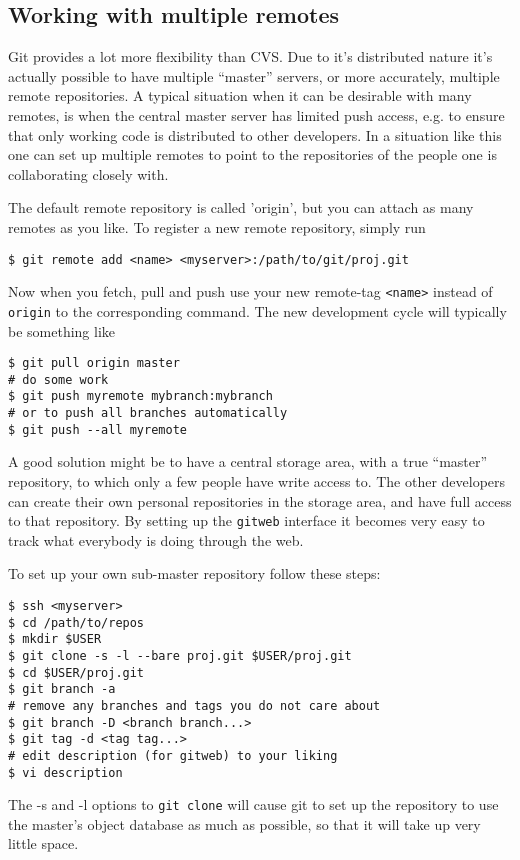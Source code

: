 \documentclass[a4paper,10pt]{article}
\begin{document}
\subsection{Working with multiple remotes}
\label{sec:remotes}
Git provides a lot more flexibility than CVS. Due to it's distributed nature
it's actually possible to have multiple ``master'' servers, or more
accurately, multiple remote repositories. 
A typical situation when it can be desirable with many remotes, is when the
central master server has limited push access, e.g. to ensure that only
working code is distributed to other developers. In a situation like this one
can set up multiple remotes to point to the repositories of the
people one is collaborating closely with.

The default remote repository is
called 'origin', but you can attach as many remotes as you like. To register a
new remote repository, simply run
\begin{verbatim}
$ git remote add <name> <myserver>:/path/to/git/proj.git
\end{verbatim}

Now when you fetch, pull and push use your new remote-tag {\tt <name>} instead 
of {\tt origin} to the corresponding command. The new development cycle will
typically be something like
\begin{verbatim}
$ git pull origin master
# do some work
$ git push myremote mybranch:mybranch
# or to push all branches automatically
$ git push --all myremote 
\end{verbatim}

A good solution might be to have a central storage area, with a true ``master'' 
repository, to which only a few people have write access to. The other
developers can create their own personal repositories in the storage area, and
have full access to that repository. By setting up the \texttt{gitweb}
interface it becomes very easy to track what everybody is doing through 
the web.

To set up your own sub-master repository follow these steps:
\begin{verbatim}
$ ssh <myserver>
$ cd /path/to/repos
$ mkdir $USER
$ git clone -s -l --bare proj.git $USER/proj.git
$ cd $USER/proj.git 
$ git branch -a 
# remove any branches and tags you do not care about
$ git branch -D <branch branch...>
$ git tag -d <tag tag...>
# edit description (for gitweb) to your liking 
$ vi description
\end{verbatim}
The -s and -l options to {\tt git clone} will cause git to set up the
repository to use the master's object database as much as possible, so that it
will take up very little space. 
\end{document}
